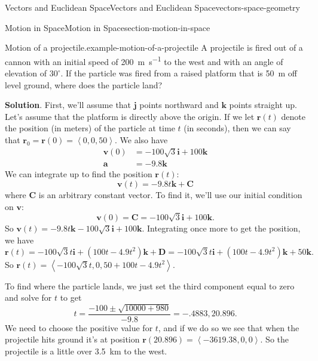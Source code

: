 \documentclass[oneside,10pt,]{book}
\numberwithin{equation}{section}
\newcommand{\vv}[1]{\mathbf{#1}}
\newcommand{\dotprod}[1]{\left\langle #1 \right\rangle}
\begin{document}
\begin{chapterptx}{Vectors and Euclidean Space}{}{Vectors and Euclidean Space}{}{}{vectors-space-geometry}
\begin{sectionptx}{Motion in Space}{}{Motion in Space}{}{}{section-motion-in-space}
\begin{example}{Motion of a projectile.}{example-motion-of-a-projectile}
\hypertarget{p-1309}{}%
A projectile is fired out of a cannon with an initial speed of \SI{200}{\meter\per\second} to the west and with an angle of elevation of \(30^{\circ}\). If the particle was fired from a raised platform that is \SI{50}{\meter} off level ground, where does the particle land?%
\par\smallskip%
\noindent\textbf{Solution}.\hypertarget{solution-209}{}\quad%
\hypertarget{p-1310}{}%
First, we'll assume that \(\vv{j}\) points northward and \(\vv{k}\) points straight up. Let's assume that the platform is directly above the origin. If we let \(\vv{r}(t)\) denote the position (in meters) of the particle at time \(t\) (in seconds), then we can say that \(\vv{r}_{0} = \vv{r}(0) = \dotprod{0,0,50}\). We also have%
%
\begin{align*}
\vv{v}(0) & = -100\sqrt{3}\vv{i} + 100\vv{k} \\
\vv{a} & = -9.8\vv{k} 
\end{align*}
\hypertarget{p-1311}{}%
We can integrate up to find the position \(\vv{r}(t)\):%
%
\begin{equation*}
\vv{v}(t) = -9.8t\vv{k}+\vv{C}
\end{equation*}
\hypertarget{p-1312}{}%
where \(\vv{C}\) is an arbitrary constant vector. To find it, we'll use our initial condition on \(\vv{v}\):%
%
\begin{equation*}
\vv{v}(0) = \vv{C} = -100\sqrt{3}\vv{i}+100\vv{k}.
\end{equation*}
\hypertarget{p-1313}{}%
So \(\vv{v}(t) = -9.8t\vv{k}-100\sqrt{3}\vv{i}+100\vv{k}\). Integrating once more to get the position, we have%
%
\begin{equation*}
\vv{r}(t) = -100\sqrt{3}t\vv{i}+(100t-4.9t^{2})\vv{k} + \vv{D} = -100\sqrt{3}t\vv{i} + (100t-4.9t^{2})\vv{k} + 50\vv{k}\text{.}
\end{equation*}
\hypertarget{p-1314}{}%
So \(\vv{r}(t) = \dotprod{-100\sqrt{3}t, 0, 50 + 100t - 4.9t^{2}}\).%
\par
\hypertarget{p-1315}{}%
To find where the particle lands, we just set the third component equal to zero and solve for \(t\) to get%
%
\begin{equation*}
t = \frac{-100\pm\sqrt{10000+980}}{-9.8} = -.4883,20.896.
\end{equation*}
\hypertarget{p-1316}{}%
We need to choose the positive value for \(t\), and if we do so we see that when the projectile hits ground it's at position \(\vv{r}(20.896) = \dotprod{-3619.38,0,0}.\) So the projectile is a little over \SI{3.5}{\kilo\meter} to the west.%

\end{example}
\end{sectionptx}
\end{chapterptx}
\end{document}
